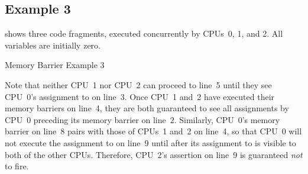 \fi

\subsection{Example 3}
\label{sec:app:whymb:Example 3}

shows three code fragments, executed concurrently by CPUs~0, 1, and 2.
All variables are initially zero.

\begin{listing*}
\scriptsize
{}
\caption{Memory Barrier Example 3}
\label{lst:app:whymb:Memory Barrier Example 3}
\end{listing*}


Note that neither CPU~1 nor CPU~2 can proceed to line~5 until they see
CPU~0's assignment to  on line~3.
Once CPU~1 and~2 have executed their memory barriers on line~4, they
are both guaranteed to see all assignments by CPU~0 preceding its memory
barrier on line~2.
Similarly, CPU~0's memory barrier on line~8 pairs with those of CPUs~1 and~2
on line~4, so that CPU~0 will not execute the assignment to  on
line~9 until after its assignment to  is visible to both of the
other CPUs.
Therefore, CPU~2's assertion on line~9 is guaranteed \emph{not} to fire.

